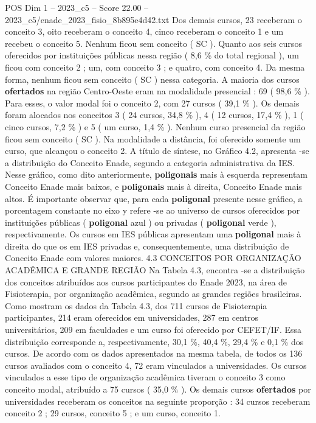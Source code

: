 \begin{textsample}{POS Dim 1 – 2023\_c5 – Score 22.00 – 2023\_c5/enade\_2023\_fisio\_8b895e4d42.txt}
Dos demais cursos, 23 receberam o conceito 3, oito receberam o conceito 4, cinco receberam o conceito 1 e um recebeu o conceito 5.
Nenhum ficou sem conceito ( SC ).
Quanto aos seis cursos oferecidos por instituições públicas nessa região ( 8,6 \% do total regional ), um ficou com conceito 2 ; um, com conceito 3 ; e quatro, com conceito 4.
Da mesma forma, nenhum ficou sem conceito ( SC ) nessa categoria.
A maioria dos cursos \textbf{ofertados} na região Centro-Oeste eram na modalidade presencial : 69 ( 98,6 \% ).
Para esses, o valor modal foi o conceito 2, com 27 cursos ( 39,1 \% ).
Os demais foram alocados nos conceitos 3 ( 24 cursos, 34,8 \% ), 4 ( 12 cursos, 17,4 \% ), 1 ( cinco cursos, 7,2 \% ) e 5 ( um curso, 1,4 \% ).
Nenhum curso presencial da região ficou sem conceito ( SC ).
Na modalidade a distância, foi oferecido somente um curso, que alcançou o conceito 2.
A título de síntese, no Gráfico 4.2, apresenta -se a distribuição do Conceito Enade, segundo a categoria administrativa da IES.
Nesse gráfico, como dito anteriormente, \textbf{poligonais} mais à esquerda representam Conceito Enade mais baixos, e \textbf{poligonais} mais à direita, Conceito Enade mais altos.
É importante observar que, para cada \textbf{poligonal} presente nesse gráfico, a porcentagem constante no eixo y refere -se ao universo de cursos oferecidos por instituições públicas ( \textbf{poligonal} azul ) ou privadas ( \textbf{poligonal} verde ), respectivamente.
Os cursos em IES públicas apresentam uma \textbf{poligonal} mais à direita do que os em IES privadas e, consequentemente, uma distribuição de Conceito Enade com valores maiores. 4.3 CONCEITOS POR ORGANIZAÇÃO ACADÊMICA E GRANDE REGIÃO Na Tabela 4.3, encontra -se a distribuição dos conceitos atribuídos aos cursos participantes do Enade 2023, na área de Fisioterapia, por organização acadêmica, segundo as grandes regiões brasileiras.
Como mostram os dados da Tabela 4.3, dos 711 cursos de Fisioterapia participantes, 214 eram oferecidos em universidades, 287 em centros universitários, 209 em faculdades e um curso foi oferecido por CEFET/IF.
Essa distribuição corresponde a, respectivamente, 30,1 \%, 40,4 \%, 29,4 \% e 0,1 \% dos cursos.
De acordo com os dados apresentados na mesma tabela, de todos os 136 cursos avaliados com o conceito 4, 72 eram vinculados a universidades.
Os cursos vinculados a esse tipo de organização acadêmica tiveram o conceito 3 como conceito modal, atribuído a 75 cursos ( 35,0 \% ).
Os demais cursos \textbf{ofertados} por universidades receberam os conceitos na seguinte proporção : 34 cursos receberam conceito 2 ; 29 cursos, conceito 5 ; e um curso, conceito 1.

\end{textsample}
